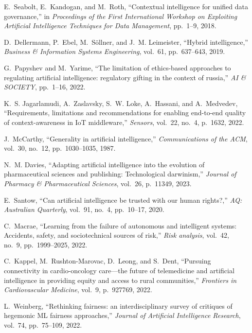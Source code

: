 \documentclass{article}
\begin{document}
\begin{thebibliography}{100}
	E.~Seabolt, E.~Kandogan, and M.~Roth, ``Contextual intelligence for unified
	data governance,'' in {\em Proceedings of the First International Workshop on
		Exploiting Artificial Intelligence Techniques for Data Management}, pp.~1--9,
	2018.
	
	D.~Dellermann, P.~Ebel, M.~S{\"o}llner, and J.~M. Leimeister, ``Hybrid
	intelligence,'' {\em Business \& Information Systems Engineering}, vol.~61,
	pp.~637--643, 2019.
	
	G.~Papyshev and M.~Yarime, ``The limitation of ethics-based approaches to
	regulating artificial intelligence: regulatory gifting in the context of
	russia,'' {\em {AI} \& SOCIETY}, pp.~1--16, 2022.
	
	K.~S. Jagarlamudi, A.~Zaslavsky, S.~W. Loke, A.~Hassani, and A.~Medvedev,
	``Requirements, limitations and recommendations for enabling end-to-end
	quality of context-awareness in {I}o{T} middleware,'' {\em Sensors}, vol.~22,
	no.~4, p.~1632, 2022.
	
	J.~McCarthy, ``Generality in artificial intelligence,'' {\em Communications of
		the ACM}, vol.~30, no.~12, pp.~1030--1035, 1987.
	
	N.~M. Davies, ``Adapting artificial intelligence into the evolution of
	pharmaceutical sciences and publishing: Technological darwinism,'' {\em
		Journal of Pharmacy \& Pharmaceutical Sciences}, vol.~26, p.~11349, 2023.
	
	E.~Santow, ``Can artificial intelligence be trusted with our human rights?,''
	{\em AQ: Australian Quarterly}, vol.~91, no.~4, pp.~10--17, 2020.
	
	C.~Macrae, ``Learning from the failure of autonomous and intelligent systems:
	Accidents, safety, and sociotechnical sources of risk,'' {\em Risk analysis},
	vol.~42, no.~9, pp.~1999--2025, 2022.
	
	C.~Kappel, M.~Rushton-Marovac, D.~Leong, and S.~Dent, ``Pursuing connectivity
	in cardio-oncology care—the future of telemedicine and artificial
	intelligence in providing equity and access to rural communities,'' {\em
		Frontiers in Cardiovascular Medicine}, vol.~9, p.~927769, 2022.
	
	L.~Weinberg, ``Rethinking fairness: an interdisciplinary survey of critiques of
	hegemonic {ML} fairness approaches,'' {\em Journal of Artificial Intelligence
		Research}, vol.~74, pp.~75--109, 2022.
	

\end{thebibliography}
\end{document}
